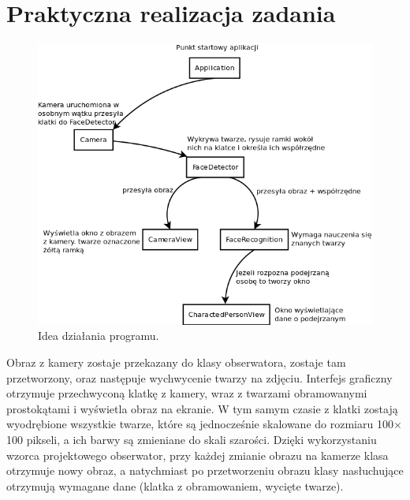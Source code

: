 \section{Praktyczna realizacja zadania}

\begin{figure}[h]
\centering
\includegraphics[scale=0.6]{./idea_dzialania_programu.png}
\caption[Idea działania programu]{Idea działania programu.}
\end{figure}


\noindent  Obraz z kamery zostaje przekazany do klasy obserwatora, zostaje tam przetworzony, oraz następuje wychwycenie twarzy na zdjęciu. Interfejs graficzny otrzymuje przechwyconą klatkę z kamery, wraz z twarzami obramowanymi prostokątami i wyświetla obraz na ekranie. W tym samym czasie z klatki zostają wyodrębione wszystkie twarze, które są jednocześnie skalowane do rozmiaru 100\begin{math}\times\end{math}100 pikseli, a ich barwy są zmieniane do skali szarości. Dzięki wykorzystaniu wzorca projektowego obserwator, przy każdej zmianie obrazu na kamerze klasa otrzymuje nowy obraz, a natychmiast po przetworzeniu obrazu klasy nasłuchujące otrzymują wymagane dane (klatka z obramowaniem, wycięte twarze). 


\pagebreak[4]
